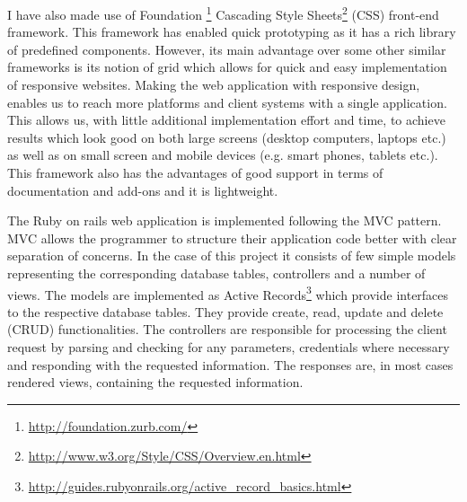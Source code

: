 I have also made use of Foundation \footnote{\url{http://foundation.zurb.com/}} Cascading Style Sheets\footnote{\url{http://www.w3.org/Style/CSS/Overview.en.html}} (CSS) front-end framework. This framework has enabled quick prototyping as it has a rich library of predefined components. However, its main advantage over some other similar frameworks is its notion of grid which allows for quick and easy implementation of responsive websites. Making the web application with responsive design, enables us to reach more platforms and client systems with a single application. This allows us, with little additional implementation effort and time, to achieve results which look good on both large screens (desktop computers, laptops etc.) as well as on small screen and mobile devices (e.g. smart phones, tablets etc.). This framework also has the advantages of good support in terms of documentation and add-ons and it is lightweight.


The Ruby on rails web application is implemented following the MVC pattern. MVC allows the programmer to structure their application code better with clear separation of concerns. In the case of this project it consists of few simple models representing the corresponding database tables, controllers and a number of views. The models are implemented as Active Records\footnote{\url{http://guides.rubyonrails.org/active_record_basics.html}} which provide interfaces to the respective database tables. They provide create, read, update and delete (CRUD) functionalities. The controllers are responsible for processing the client request by parsing and checking for any parameters, credentials where necessary and responding with the requested information. The responses are, in most cases rendered views, containing the requested information.

